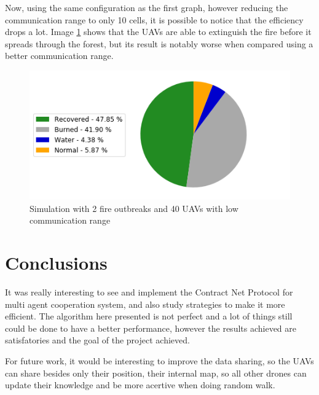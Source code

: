 \documentclass{article}
\begin{document}
Now, using the same configuration as the first graph, however reducing the communication range to only 10 cells, it is possible to notice that the efficiency drops a lot. Image \ref{fig:fig4} shows that the UAVs are able to extinguish the fire before it spreads through the forest, but its result is notably worse when compared using a better communication range.

\begin{figure}[!ht]
\centering
\includegraphics[scale=0.6]{fires_2_uavs_40_range_10}
\caption{Simulation with 2 fire outbreaks and 40 UAVs with low communication range}
\label{fig:fig4}
\end{figure}

\section{Conclusions}
It was really interesting to see and implement the Contract Net Protocol for multi agent cooperation system, and also study strategies to make it more efficient. The algorithm here presented is not perfect and a lot of things still could be done to have a better performance, however the results achieved are satisfatories and the goal of the project achieved.

For future work, it would be interesting to improve the data sharing, so the UAVs can share besides only their position, their internal map, so all other drones can update their knowledge and be more acertive when doing random walk.
\end{document}
